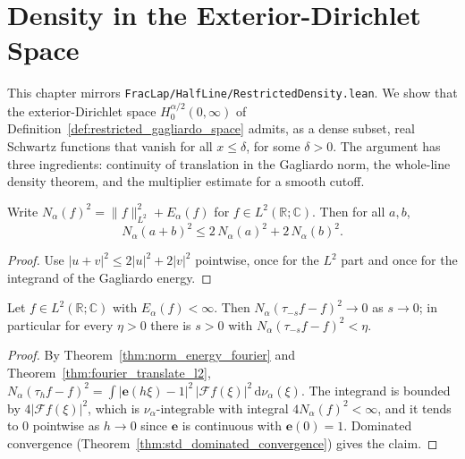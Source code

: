 \chapter{Density in the Exterior-Dirichlet Space}

This chapter mirrors \texttt{FracLap/HalfLine/RestrictedDensity.lean}. We show that the exterior-Dirichlet space $H^{\alpha/2}_0(0, \infty)$ of Definition~\ref{def:restricted_gagliardo_space} admits, as a dense subset, real Schwartz functions that vanish for all $x \le \delta$, for some $\delta > 0$. The argument has three ingredients: continuity of translation in the Gagliardo norm, the whole-line density theorem, and the multiplier estimate for a smooth cutoff.

\begin{lemma}\label{lem:gagliardo_n2_add}
\leanok
Write $N_\alpha(f)^2 = \lVert f \rVert_{L^2}^2 + E_\alpha(f)$ for $f \in L^2(\mathbb{R}; \mathbb{C})$. Then for all $a, b$,
\[
  N_\alpha(a + b)^2 \le 2\, N_\alpha(a)^2 + 2\, N_\alpha(b)^2.
\]
\end{lemma}

\begin{proof}
\leanok
Use $\lvert u + v \rvert^2 \le 2 \lvert u \rvert^2 + 2 \lvert v \rvert^2$ pointwise, once for the $L^2$ part and once for the integrand of the Gagliardo energy.
\end{proof}

\begin{theorem}\label{thm:translation_continuity}
\leanok
Let $f \in L^2(\mathbb{R}; \mathbb{C})$ with $E_\alpha(f) < \infty$. Then $N_\alpha(\tau_{-s} f - f)^2 \to 0$ as $s \to 0$; in particular for every $\eta > 0$ there is $s > 0$ with $N_\alpha(\tau_{-s} f - f)^2 < \eta$.
\end{theorem}

\begin{proof}
\leanok
By Theorem~\ref{thm:norm_energy_fourier} and Theorem~\ref{thm:fourier_translate_l2}, $N_\alpha(\tau_h f - f)^2 = \int \lvert \mathbf{e}(h \xi) - 1 \rvert^2 \, \lvert \mathcal{F}f(\xi) \rvert^2 \, \mathrm{d}\nu_\alpha(\xi)$. The integrand is bounded by $4 \lvert \mathcal{F}f(\xi) \rvert^2$, which is $\nu_\alpha$-integrable with integral $4 N_\alpha(f)^2 < \infty$, and it tends to $0$ pointwise as $h \to 0$ since $\mathbf{e}$ is continuous with $\mathbf{e}(0) = 1$. Dominated convergence (Theorem~\ref{thm:std_dominated_convergence}) gives the claim.
\end{proof}

